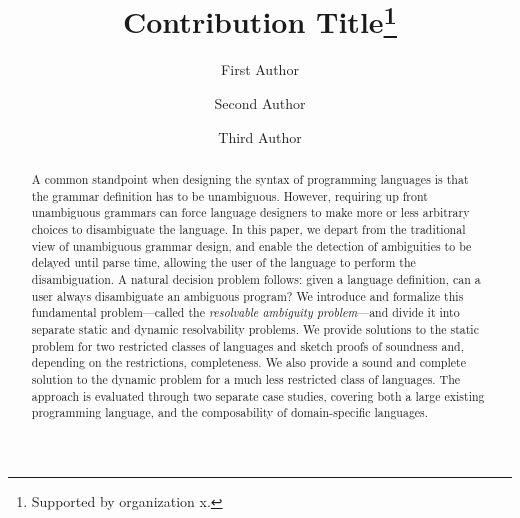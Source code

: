\documentclass[runningheads]{llncs}
\begin{document}

\title{Contribution Title\thanks{Supported by organization x.}}
%
%
\author{First Author \and
Second Author \and
Third Author}
%
%
%
\maketitle              %
%
\begin{abstract}
A common standpoint when designing the syntax of programming languages is that
the grammar definition has to be unambiguous.  However, requiring up front unambiguous grammars
can force language designers to make more or less arbitrary choices to disambiguate
the language. In this paper, we depart from the traditional view of
unambiguous grammar design, and enable the detection of ambiguities to be delayed until
parse time, allowing the user of the language to perform the disambiguation. A
natural decision problem follows: given a language definition, can a
user always disambiguate an ambiguous program?  We introduce and
formalize this fundamental problem---called the \emph{resolvable
  ambiguity problem}---and divide it into separate static and dynamic
resolvability problems. We provide solutions to the static problem
for two restricted classes of languages and sketch proofs of soundness and,
depending on the restrictions, completeness. We also provide a sound
and complete solution to the dynamic problem for a much less
restricted class of languages.
%
The approach is evaluated through two separate case studies,
covering both a large existing programming language, and the
composability of domain-specific languages.
\end{abstract}
%
%
%
\end{document}
